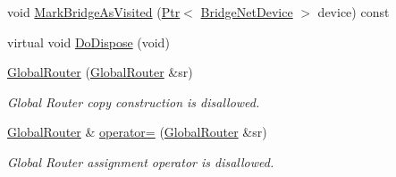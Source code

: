 \begin{DoxyCompactItemize}
\item 
void \hyperlink{classns3_1_1GlobalRouter_a27297efb3e69712604932d5275ab2abb}{Mark\+Bridge\+As\+Visited} (\hyperlink{classns3_1_1Ptr}{Ptr}$<$ \hyperlink{classns3_1_1BridgeNetDevice}{Bridge\+Net\+Device} $>$ device) const 
\item 
virtual void \hyperlink{classns3_1_1GlobalRouter_a19d984861cd9f427781d291c57f7b1c6}{Do\+Dispose} (void)
\item 
\hyperlink{classns3_1_1GlobalRouter_a243a16e49c8b862db8460a5e4e11858a}{Global\+Router} (\hyperlink{classns3_1_1GlobalRouter}{Global\+Router} \&sr)
\begin{DoxyCompactList}\small\item\em Global Router copy construction is disallowed. \end{DoxyCompactList}\item 
\hyperlink{classns3_1_1GlobalRouter}{Global\+Router} \& \hyperlink{classns3_1_1GlobalRouter_a8a3edaf983ba050a8326d943e556c04e}{operator=} (\hyperlink{classns3_1_1GlobalRouter}{Global\+Router} \&sr)
\begin{DoxyCompactList}\small\item\em Global Router assignment operator is disallowed. \end{DoxyCompactList}\end{DoxyCompactItemize}
